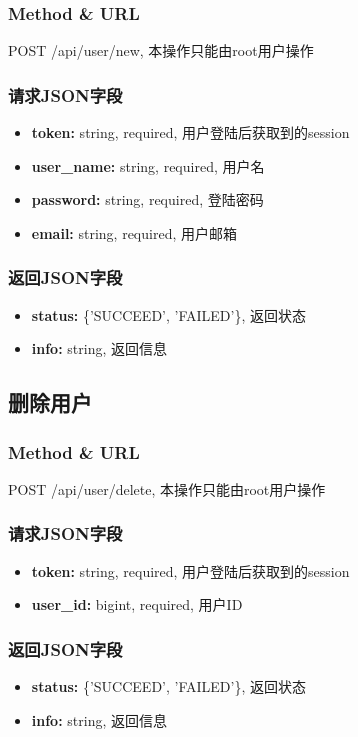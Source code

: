 ﻿\documentclass[a4paper]{report}
\begin{document}
\subsubsection{Method \& URL} %
POST /api/user/new, 本操作只能由root用户操作

\subsubsection{请求JSON字段}
\begin{itemize}
	\item \textbf{token:} string, required, 用户登陆后获取到的session
	\item \textbf{user\_name:} string, required, 用户名
	\item \textbf{password:} string, required, 登陆密码
	\item \textbf{email:} string, required, 用户邮箱
\end{itemize}

\subsubsection{返回JSON字段}
\begin{itemize}
	\item \textbf{status:} \{'SUCCEED', 'FAILED'\}, 返回状态
	\item \textbf{info:} string, 返回信息
\end{itemize}



\subsection{删除用户} %
\subsubsection{Method \& URL} %
POST /api/user/delete, 本操作只能由root用户操作

\subsubsection{请求JSON字段}
\begin{itemize}
	\item \textbf{token:} string, required, 用户登陆后获取到的session
	\item \textbf{user\_id:} bigint, required, 用户ID
\end{itemize}

\subsubsection{返回JSON字段}
\begin{itemize}
	\item \textbf{status:} \{'SUCCEED', 'FAILED'\}, 返回状态
	\item \textbf{info:} string, 返回信息
\end{itemize}
\end{document}
